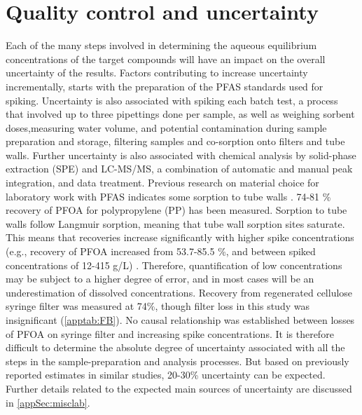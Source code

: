 \section{Quality control and uncertainty\label{sec:losses}}
Each of the many steps involved in determining the aqueous equilibrium concentrations of the target compounds will have an impact on the overall uncertainty of the results. Factors contributing to increase uncertainty incrementally, starts with the preparation of the PFAS standards used for spiking. Uncertainty is also associated with spiking each batch test, a process that involved up to three pipettings done per sample, as well as weighing sorbent doses,measuring water volume, and potential contamination during sample preparation and storage, filtering samples and co-sorption onto filters and tube walls. Further uncertainty is also associated with chemical analysis by solid-phase extraction (SPE) and LC-MS/MS, a combination of automatic and manual peak integration, and data treatment. Previous research on material choice for laboratory work with PFAS indicates some sorption to tube walls \citep{Lath2019labsorb}. 74-81 \% recovery of PFOA for polypropylene (PP) has been measured. Sorption to tube walls follow Langmuir sorption, meaning that tube wall sorption sites saturate. This means that recoveries increase significantly with higher spike concentrations (e.g., recovery of PFOA increased from 53.7-85.5 \%, and between spiked concentrations of 12-415 \textmu g/L) \citep{Lath2019labsorb}. Therefore, quantification of low concentrations may be subject to a higher degree of error, and in most cases will be an underestimation of dissolved concentrations. Recovery from regenerated cellulose syringe filter was measured at 74\%, though filter loss in this study was insignificant (\cref{apptab:FB}). No causal relationship was established between losses of PFOA on syringe filter and increasing spike concentrations. It is therefore difficult to determine the absolute degree of uncertainty associated with all the steps in the sample-preparation and analysis processes. But based on previously reported estimates in similar studies, 20-30\% uncertainty can be expected. Further details related to the expected main sources of uncertainty are discussed in \cref{appSec:misclab}. 



